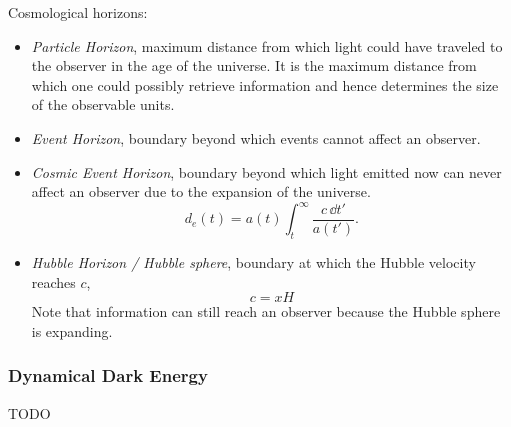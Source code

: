 			\noindent
			Cosmological horizons:
			\begin{itemize}
				\item \emph{Particle Horizon}, maximum distance from which light could have traveled to the observer in the age of the universe. It is the maximum distance from which one could possibly retrieve information and hence determines the size of the observable units.
				\item \emph{Event Horizon}, boundary beyond which events cannot affect an observer.
				\item \emph{Cosmic Event Horizon}, boundary beyond which light emitted now can never affect an observer due to the expansion of the universe.
					\begin{equation}
						d_e(t) = a(t) \int^{\infty}_{t} \frac{c \,\dd t'}{a(t')}.
					\end{equation}
				\item \emph{Hubble Horizon / Hubble sphere}, boundary at which the Hubble velocity reaches $c$,
					\begin{equation}
						c = x H
					\end{equation}
					Note that information can still reach an observer because the Hubble sphere is expanding.
			\end{itemize}


		\subsubsection{Dynamical Dark Energy}
			TODO

